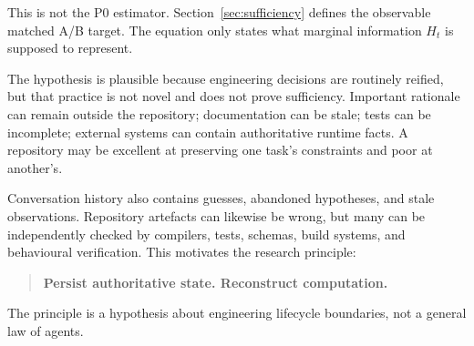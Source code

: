 This is not the P0 estimator. Section~\ref{sec:sufficiency} defines the observable matched A/B target. The equation only states what marginal information $H_t$ is supposed to represent.

The hypothesis is plausible because engineering decisions are routinely reified, but that practice is not novel and does not prove sufficiency. Important rationale can remain outside the repository; documentation can be stale; tests can be incomplete; external systems can contain authoritative runtime facts. A repository may be excellent at preserving one task's constraints and poor at another's.

Conversation history also contains guesses, abandoned hypotheses, and stale observations. Repository artefacts can likewise be wrong, but many can be independently checked by compilers, tests, schemas, build systems, and behavioural verification. This motivates the research principle:
\begin{quote}
\textbf{Persist authoritative state. Reconstruct computation.}
\end{quote}

The principle is a hypothesis about engineering lifecycle boundaries, not a general law of agents.
